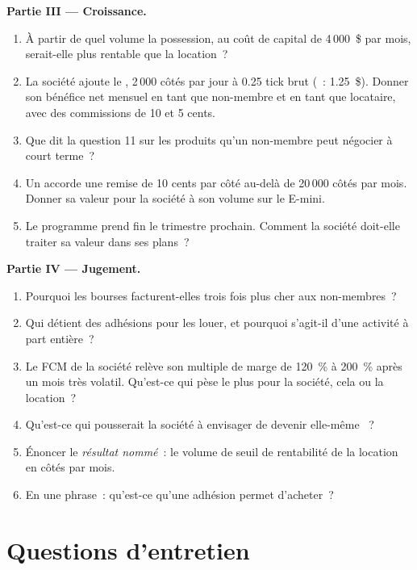 \begin{problem}
\medskip\noindent\textbf{Partie III --- Croissance.}
\begin{enumerate}[resume]
\item À partir de quel volume la possession, au coût de capital de 4\,000~\$ par mois, serait-elle
plus rentable que la location~?
\item La société ajoute le , 2\,000 côtés par jour à 0.25 tick brut
(~: 1.25~\$). Donner son bénéfice net mensuel en tant que non-membre et en tant que locataire, avec
des commissions de 10 et 5 cents.
\item Que dit la question 11 sur les produits qu'un non-membre peut négocier
à court terme~?
\item Un  accorde une remise de 10 cents par côté au-delà de 20\,000 côtés
par mois. Donner sa valeur pour la société à son volume sur le E-mini.
\item Le programme prend fin le trimestre prochain. Comment la société doit-elle traiter sa valeur dans
ses plans~?
\end{enumerate}

\medskip\noindent\textbf{Partie IV --- Jugement.}
\begin{enumerate}[resume]
\item Pourquoi les bourses facturent-elles trois fois plus cher aux non-membres~?
\item Qui détient des adhésions pour les louer, et pourquoi s'agit-il d'une activité à part entière~?
\item Le FCM de la société relève son multiple de marge de 120~\% à 200~\% après un
mois très volatil. Qu'est-ce qui pèse le plus pour la société, cela ou la location~?
\item Qu'est-ce qui pousserait la société à envisager de devenir elle-même ~?
\item Énoncer le \emph{résultat nommé}~: le volume de seuil de rentabilité de la location en
côtés par mois.
\item En une phrase~: qu'est-ce qu'une adhésion permet d'acheter~?
\end{enumerate}
\end{problem}

\section{Questions d'entretien}

